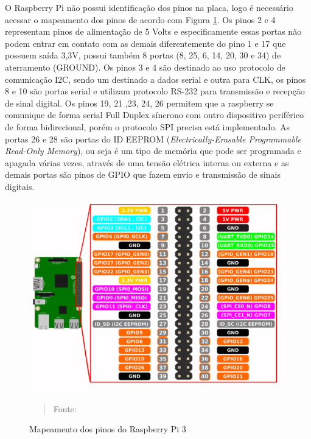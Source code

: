 \documentclass[12pt, a4paper]{article}
\begin{document}
O Raspberry Pi não possui identificação dos pinos na placa, logo é necessário acessar o mapeamento dos pinos de acordo com Figura \ref{fig:pinosraspb}. Os pinos 2 e 4 representam pinos de alimentação de 5 Volts e especificamente essas portas não podem entrar em contato com as demais diferentemente do pino 1 e 17 que possuem saída 3,3V,  possui também 8 portas (8, 25, 6, 14, 20, 30 e 34) de aterramento (GROUND). Os pinos 3 e 4 são destinado ao uso protocolo de comunicação I2C, sendo um destinado a dados serial e outra para CLK, os pinos 8 e 10 são portas serial e utilizam protocolo RS-232 para transmissão e recepção de sinal digital. Os pinos 19, 21 ,23, 24, 26 permitem que a raspberry se comunique de forma serial Full Duplex síncrono com outro dispositivo periférico de forma bidirecional, porém o protocolo SPI precisa está implementado. As portas 26 e 28 são  portas do ID EEPROM  (\textit{Electrically-Erasable Programmable Read-Only Memory}), ou seja é um tipo de memória que pode ser programada e apagada várias vezes, através de uma tensão elétrica interna ou externa e as demais portas são pinos de GPIO que fazem envio e transmissão de sinais digitais. %

\begin{figure}[H]
\begin{center}
			\caption{Mapeamento dos pinos do Raspberry Pi 3}
			\includegraphics[width=.9\textwidth]{Figuras/pins.PNG}
			\vspace*{\fill} 
            \begin{quote} 
            \centering 
           Fonte: \cite{ras}
            \end{quote}
            \vspace*{\fill}
			\label{fig:pinosraspb}
\end{center}
\end{figure}
\end{document}
